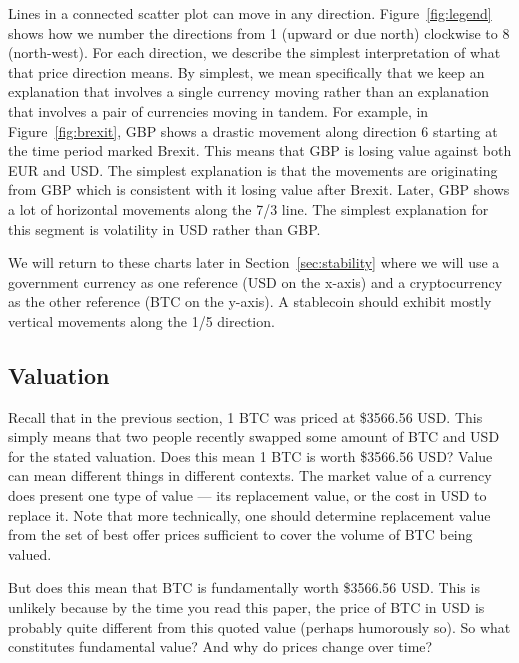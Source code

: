 Lines in a connected scatter plot can move in any direction. Figure~\ref{fig:legend} shows how we number the directions from 1 (upward or due north) clockwise to 8 (north-west). For each direction, we describe the simplest interpretation of what that price direction means. By simplest, we mean specifically that we keep an explanation that involves a single currency moving rather than an explanation that involves a pair of currencies moving in tandem. For example, in Figure~\ref{fig:brexit}, GBP shows a drastic movement along direction 6 starting at the time period marked Brexit. This means that GBP is losing value against both EUR and USD. The simplest explanation is that the movements are originating from GBP which is consistent with it losing value after Brexit. Later, GBP shows a lot of horizontal movements along the 7/3 line. The simplest explanation for this segment is volatility in USD rather than GBP. 

We will return to these charts later in Section~\ref{sec:stability} where we will use a government currency as one reference (USD on the x-axis) and a cryptocurrency as the other reference (BTC on the y-axis). A stablecoin should exhibit mostly vertical movements along the 1/5 direction. 

\subsection{Valuation}

Recall that in the previous section, 1 BTC was priced at \$3566.56 USD. This simply means that two people recently swapped some amount of BTC and USD for the stated valuation. Does this mean 1 BTC is worth \$3566.56 USD? Value can mean different things in different contexts. The market value of a currency does present one type of value --- its replacement value, or the cost in USD to replace it. Note that more technically, one should  determine replacement value from the set of best offer prices sufficient to cover the volume of BTC being valued.

But does this mean that BTC is fundamentally worth \$3566.56 USD. This is unlikely because by the time you read this paper, the price of BTC in USD is probably quite different from this quoted value (perhaps humorously so). So what constitutes fundamental value? And why do prices change over time?

